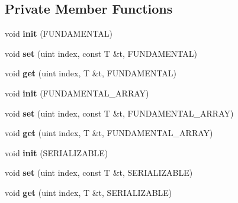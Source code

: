 \subsection*{Private Member Functions}
\begin{DoxyCompactItemize}
\item 
void {\bfseries init} (F\+U\+N\+D\+A\+M\+E\+N\+T\+AL)\hypertarget{classshared__memory_1_1array_a41258d788855ccc8435efb2017bdd068}{}\label{classshared__memory_1_1array_a41258d788855ccc8435efb2017bdd068}

\item 
void {\bfseries set} (uint index, const T \&t, F\+U\+N\+D\+A\+M\+E\+N\+T\+AL)\hypertarget{classshared__memory_1_1array_ad7fa6301507f10efe97ce3ad40187d9f}{}\label{classshared__memory_1_1array_ad7fa6301507f10efe97ce3ad40187d9f}

\item 
void {\bfseries get} (uint index, T \&t, F\+U\+N\+D\+A\+M\+E\+N\+T\+AL)\hypertarget{classshared__memory_1_1array_a0a54a689331205da7338f7c5891a6ee5}{}\label{classshared__memory_1_1array_a0a54a689331205da7338f7c5891a6ee5}

\item 
void {\bfseries init} (F\+U\+N\+D\+A\+M\+E\+N\+T\+A\+L\+\_\+\+A\+R\+R\+AY)\hypertarget{classshared__memory_1_1array_ac0e57adf8e47afae3f8053c20c3e15f2}{}\label{classshared__memory_1_1array_ac0e57adf8e47afae3f8053c20c3e15f2}

\item 
void {\bfseries set} (uint index, const T \&t, F\+U\+N\+D\+A\+M\+E\+N\+T\+A\+L\+\_\+\+A\+R\+R\+AY)\hypertarget{classshared__memory_1_1array_a71bbc60da4a88fd51b3124cdb6cd1ae3}{}\label{classshared__memory_1_1array_a71bbc60da4a88fd51b3124cdb6cd1ae3}

\item 
void {\bfseries get} (uint index, T \&t, F\+U\+N\+D\+A\+M\+E\+N\+T\+A\+L\+\_\+\+A\+R\+R\+AY)\hypertarget{classshared__memory_1_1array_af12c8f76fc48b3ec1ff2c2c82d104837}{}\label{classshared__memory_1_1array_af12c8f76fc48b3ec1ff2c2c82d104837}

\item 
void {\bfseries init} (S\+E\+R\+I\+A\+L\+I\+Z\+A\+B\+LE)\hypertarget{classshared__memory_1_1array_a487be484bf27d17f8c7547a57ff995f9}{}\label{classshared__memory_1_1array_a487be484bf27d17f8c7547a57ff995f9}

\item 
void {\bfseries set} (uint index, const T \&t, S\+E\+R\+I\+A\+L\+I\+Z\+A\+B\+LE)\hypertarget{classshared__memory_1_1array_a951c9ca373e942f094910bea57953eb0}{}\label{classshared__memory_1_1array_a951c9ca373e942f094910bea57953eb0}

\item 
void {\bfseries get} (uint index, T \&t, S\+E\+R\+I\+A\+L\+I\+Z\+A\+B\+LE)\hypertarget{classshared__memory_1_1array_afb0025021b69b790c152c27ef441cd66}{}\label{classshared__memory_1_1array_afb0025021b69b790c152c27ef441cd66}

\end{DoxyCompactItemize}

